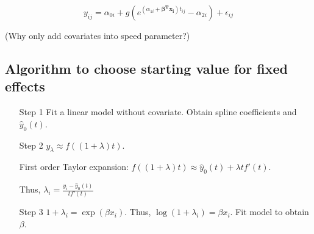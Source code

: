 \documentclass{article}
\numberwithin{equation}{section}
\begin{document}
 \begin{equation}\label{meth:sim3}
 y_{ij}=\alpha_{0i}+g(e^{(\alpha_{1i}+\bm{\beta^T} \bm{x_i})t_{ij}} -\alpha_{2i}) + \epsilon_{ij}
 \end{equation}
 
(Why only add covariates into speed parameter?)

 
 \subsection{Algorithm to choose starting value for fixed effects}
 \begin{itemize}
 	\item[Step 1] Fit a linear model without covariate. Obtain spline coefficients and $\hat{y}_0(t)$.
 	\item[Step 2] $y_{\lambda} \approx f((1+\lambda)t)$. 
 	
 	      First order Taylor expansion: $f((1+\lambda)t) \approx \hat{y}_0(t) + \lambda t f'(t)$. 
 	      
 	      Thus, $\lambda_i = \frac{y_i-\hat{y}_0(t)}{tf'(t)}$
 	      
 	      \item[Step 3] $1+\lambda_i=\exp(\beta x_i)$. Thus, $\log(1+\lambda_i) = \beta x_i$. Fit model to obtain $\beta$.
 \end{itemize}
 
\end{document}
